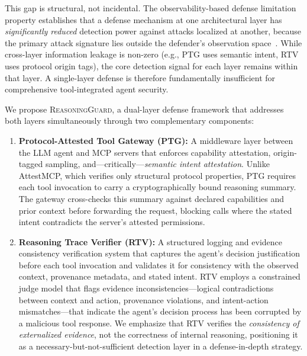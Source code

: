 This gap is structural, not incidental. The observability-based defense limitation property establishes that a defense mechanism at one architectural layer has \emph{significantly reduced} detection power against attacks localized at another, because the primary attack signature lies outside the defender's observation space~\citep{lasm2026}. While cross-layer information leakage is non-zero (e.g., PTG uses semantic intent, RTV uses protocol origin tags), the core detection signal for each layer remains within that layer. A single-layer defense is therefore fundamentally insufficient for comprehensive tool-integrated agent security.

We propose \textsc{ReasoningGuard}, a dual-layer defense framework that addresses both layers simultaneously through two complementary components:

\begin{enumerate}
\item \textbf{Protocol-Attested Tool Gateway (PTG):} A middleware layer between the LLM agent and MCP servers that enforces capability attestation, origin-tagged sampling, and---critically---\emph{semantic intent attestation}. Unlike AttestMCP, which verifies only structural protocol properties, PTG requires each tool invocation to carry a cryptographically bound reasoning summary. The gateway cross-checks this summary against declared capabilities and prior context before forwarding the request, blocking calls where the stated intent contradicts the server's attested permissions.

\item \textbf{Reasoning Trace Verifier (RTV):} A structured logging and evidence consistency verification system that captures the agent's decision justification before each tool invocation and validates it for consistency with the observed context, provenance metadata, and stated intent. RTV employs a constrained judge model that flags evidence inconsistencies---logical contradictions between context and action, provenance violations, and intent-action mismatches---that indicate the agent's decision process has been corrupted by a malicious tool response. We emphasize that RTV verifies the \emph{consistency of externalized evidence}, not the correctness of internal reasoning, positioning it as a necessary-but-not-sufficient detection layer in a defense-in-depth strategy.
\end{enumerate}

